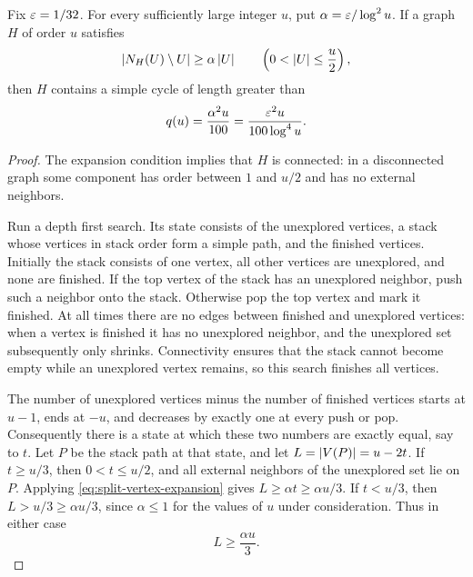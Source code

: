 \begin{lemma}
\label{lem:split-vertex-expansion}
Fix $\varepsilon=1/32$.  For every sufficiently large integer $u$, put
$\alpha=\varepsilon/\log^2 u$.  If a graph $H$ of order $u$ satisfies
\begin{equation}\label{eq:split-vertex-expansion}
  \left|N_H(U)\setminus U\right|\ge\alpha\left|U\right|
  \qquad\left(0<\left|U\right|\le\frac u2\right),
\end{equation}
then $H$ contains a simple cycle of length greater than
\begin{equation}\label{eq:split-long-cycle-length}
  q(u)=\frac{\alpha^2u}{100}
      =\frac{\varepsilon^2u}{100\log^4u}.
\end{equation}
\end{lemma}

\begin{proof}
The expansion condition implies that $H$ is connected: in a
disconnected graph some component has order between $1$ and $u/2$ and
has no external neighbors.

Run a depth first search.  Its state consists of the unexplored
vertices, a stack whose vertices in stack order form a simple path, and the finished
vertices.  Initially the stack consists of one vertex, all other
vertices are unexplored, and none are finished.  If the top vertex of
the stack has an unexplored neighbor, push such a neighbor onto the
stack.  Otherwise pop the top vertex and mark it finished.  At all
times there are no edges between finished and unexplored vertices:
when a vertex is finished it has no unexplored neighbor, and the
unexplored set subsequently only shrinks.  Connectivity ensures that
the stack cannot become empty while an unexplored vertex remains, so
this search finishes all vertices.

The number of unexplored vertices minus the number of finished
vertices starts at $u-1$, ends at $-u$, and decreases by exactly one at
every push or pop.  Consequently there is a state at which these two
numbers are exactly equal, say to $t$.  Let $P$ be the stack path at
that state, and let $L=\left|V(P)\right|=u-2t$.  If $t\ge u/3$, then
$0<t\le u/2$, and all external neighbors of the unexplored set lie on
$P$.  Applying \eqref{eq:split-vertex-expansion} gives
$L\ge\alpha t\ge\alpha u/3$.  If $t<u/3$, then
$L>u/3\ge\alpha u/3$, since $\alpha\le1$ for the values of $u$ under
consideration.  Thus in either case
\begin{equation}\label{eq:split-stack-order}
  L\ge\frac{\alpha u}{3}.
\end{equation}


\end{proof}
